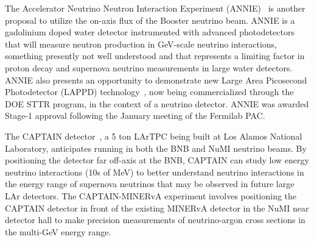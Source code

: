 The Accelerator Neutrino Neutron Interaction Experiment
(ANNIE)~\cite{Anghel:2014ynd} is another proposal to utilize the
on-axis flux of the Booster neutrino beam.  ANNIE is a gadolinium
doped water detector instrumented with advanced photodetectors that
will measure neutron production in GeV-scale neutrino interactions,
something presently not well understood and that represents a limiting
factor in proton decay and supernova neutrino measurements in large
water detectors.  ANNIE also presents an opportunity to demonstrate
new Large Area Picosecond Photodetector (LAPPD)
technology~\cite{lappd}, now being commercialized through the DOE STTR
program, in the context of a neutrino detector. ANNIE was awarded
Stage-1 approval following the January meeting of the Fermilab PAC.


The CAPTAIN detector~\cite{Berns:2013usa}, a 5 ton LArTPC being built
at Los Alamos National Laboratory, anticipates running in both the BNB
and NuMI neutrino beams.  By positioning the detector far off-axis at
the BNB, CAPTAIN can study low energy neutrino interactions (10s of
MeV) to better understand neutrino interactions in the energy range of
supernova neutrinos that may be observed in future large LAr
detectors.  The CAPTAIN-MINERvA experiment involves positioning the
CAPTAIN detector in front of the existing MINERvA detector in the NuMI
near detector hall to make precision measurements of neutrino-argon
cross sections in the multi-GeV energy range.


